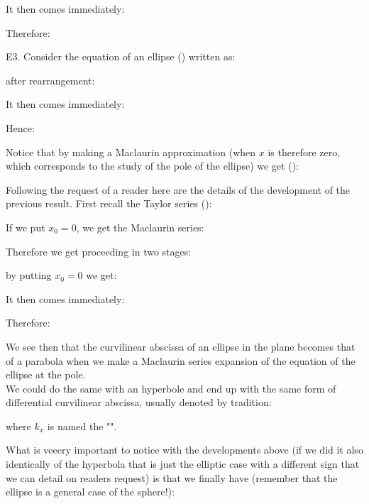 {\begin{tcolorbox}[colframe=black,colback=white,sharp corners]
	It then comes immediately:
	
	Therefore:
	
	E3. Consider the equation of an ellipse () written as:
	
	after rearrangement:
	
	It then comes immediately:
	
	Hence:
	
	\end{tcolorbox}
	
	\pagebreak
	\begin{tcolorbox}[colframe=black,colback=white,sharp corners]
	Notice that by making a Maclaurin approximation (when $x$ is therefore zero, which corresponds to the study of the pole of the ellipse) we get ():
	
	Following the request of a reader here are the details of the development of the previous result. First recall the Taylor series ():
	
	If we put $x_0=0$, we get the Maclaurin series:
	
	Therefore we get proceeding in two stages:
	
	\end{tcolorbox}
	\begin{tcolorbox}[colframe=black,colback=white,sharp corners]
	
	by putting $x_0=0$ we get:
	
	It then comes immediately:
	
	Therefore:
	
	\end{tcolorbox}
	
	\pagebreak
	\begin{tcolorbox}[colframe=black,colback=white,sharp corners]
	We see then that the curvilinear abscissa of an ellipse in the plane becomes that of a parabola when we make a Maclaurin series expansion of the equation of the ellipse at the pole.\\
	
	We could do the same with an hyperbole and end up with the same form of differential curvilinear abscissa, usually denoted by tradition:
	
	where $k_x$ is named the "".
	\end{tcolorbox}
	\label{curvature parameter} What is veeery important to notice with the developments above (if we did it also identically of the hyperbola that is just the elliptic case with a different sign that we can detail on readers request) is that we finally have (remember that the ellipse is a general case of the sphere!):
	
}

